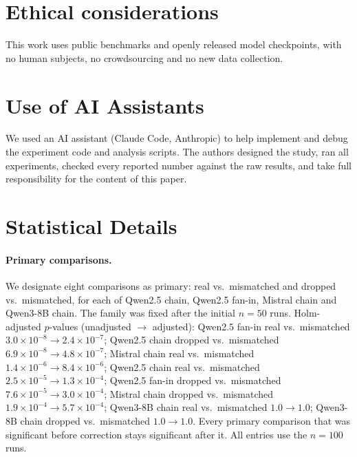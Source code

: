 \documentclass[11pt]{article}
\begin{document}
\section*{Ethical considerations}

This work uses public benchmarks and openly
released model checkpoints, with no human subjects, no crowdsourcing and no new
data collection.

\section*{Use of AI Assistants}

We used an AI assistant (Claude Code, Anthropic) to help implement and debug the
experiment code and analysis scripts. The authors designed the study, ran all
experiments, checked every reported number against the raw results, and take full
responsibility for the content of this paper.





\appendix

\section{Statistical Details}
\label{app:stats}

\paragraph{Primary comparisons.} We designate eight comparisons as primary:
real vs.\ mismatched and dropped vs.\ mismatched, for each of Qwen2.5 chain,
Qwen2.5 fan-in, Mistral chain and Qwen3-8B chain. The family was fixed after
the initial $n{=}50$ runs. Holm-adjusted $p$-values (unadjusted $\to$
adjusted): Qwen2.5 fan-in real vs.\ mismatched $3.0\times10^{-8}\to
2.4\times10^{-7}$; Qwen2.5 chain dropped vs.\ mismatched $6.9\times10^{-8}\to
4.8\times10^{-7}$; Mistral chain real vs.\ mismatched $1.4\times10^{-6}\to
8.4\times10^{-6}$; Qwen2.5 chain real vs.\ mismatched $2.5\times10^{-5}\to
1.3\times10^{-4}$; Qwen2.5 fan-in dropped vs.\ mismatched $7.6\times10^{-5}\to
3.0\times10^{-4}$; Mistral chain dropped vs.\ mismatched $1.9\times10^{-4}\to
5.7\times10^{-4}$; Qwen3-8B chain real vs.\ mismatched $1.0\to1.0$; Qwen3-8B
chain dropped vs.\ mismatched $1.0\to1.0$. Every primary comparison that was
significant before correction stays significant after it. All entries use the
$n{=}100$ runs.
\end{document}
